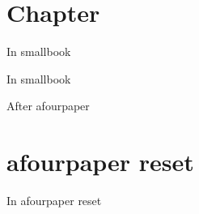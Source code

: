 \documentclass{book}
\newcommand{\Texinfothechapterheading}{}
\newcommand{\Texinfoheadingchaptername}{\chaptername}
\newcommand{\Texinfochapter}[1]{\chapter{#1}
\renewcommand{\Texinfothechapterheading}{\Texinfoheadingchaptername{} \thechapter{} }%
}%
\renewcommand{\_}{\Texinfounderscore\discretionary{}{}{}}
\begin{document}
\label{anchor:Top}%
\Texinfochapter{{Chapter}}
\label{anchor:chapter}%

\geometry{paperheight=9.25in,paperwidth=7in}%

 In smallbook

In smallbook
\geometry{papername=a4paper}%

After afourpaper

\Texinfochapter{{afourpaper reset}}
\label{anchor:afourpaper-reset}%

In afourpaper reset
\end{document}
